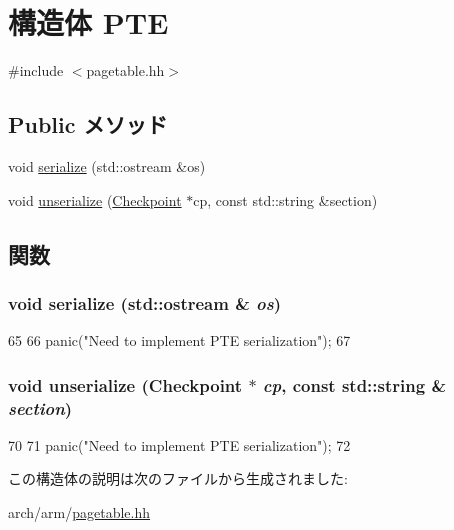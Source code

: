 \hypertarget{structArmISA_1_1PTE}{
\section{構造体 PTE}
\label{structArmISA_1_1PTE}
}


{\ttfamily \#include $<$pagetable.hh$>$}\subsection*{Public メソッド}
\begin{DoxyCompactItemize}
\item 
void \hyperlink{structArmISA_1_1PTE_a53e036786d17361be4c7320d39c99b84}{serialize} (std::ostream \&os)
\item 
void \hyperlink{structArmISA_1_1PTE_af22e5d6d660b97db37003ac61ac4ee49}{unserialize} (\hyperlink{classCheckpoint}{Checkpoint} $\ast$cp, const std::string \&section)
\end{DoxyCompactItemize}


\subsection{関数}
\hypertarget{structArmISA_1_1PTE_a53e036786d17361be4c7320d39c99b84}{
\subsubsection[{serialize}]{\setlength{\rightskip}{0pt plus 5cm}void serialize (std::ostream \& {\em os})}}
\label{structArmISA_1_1PTE_a53e036786d17361be4c7320d39c99b84}



\begin{DoxyCode}
65     {
66         panic("Need to implement PTE serialization\n");
67     }
\end{DoxyCode}
\hypertarget{structArmISA_1_1PTE_af22e5d6d660b97db37003ac61ac4ee49}{
\subsubsection[{unserialize}]{\setlength{\rightskip}{0pt plus 5cm}void unserialize ({\bf Checkpoint} $\ast$ {\em cp}, \/  const std::string \& {\em section})}}
\label{structArmISA_1_1PTE_af22e5d6d660b97db37003ac61ac4ee49}



\begin{DoxyCode}
70     {
71         panic("Need to implement PTE serialization\n");
72     }
\end{DoxyCode}


この構造体の説明は次のファイルから生成されました:\begin{DoxyCompactItemize}
\item 
arch/arm/\hyperlink{arm_2pagetable_8hh}{pagetable.hh}\end{DoxyCompactItemize}

